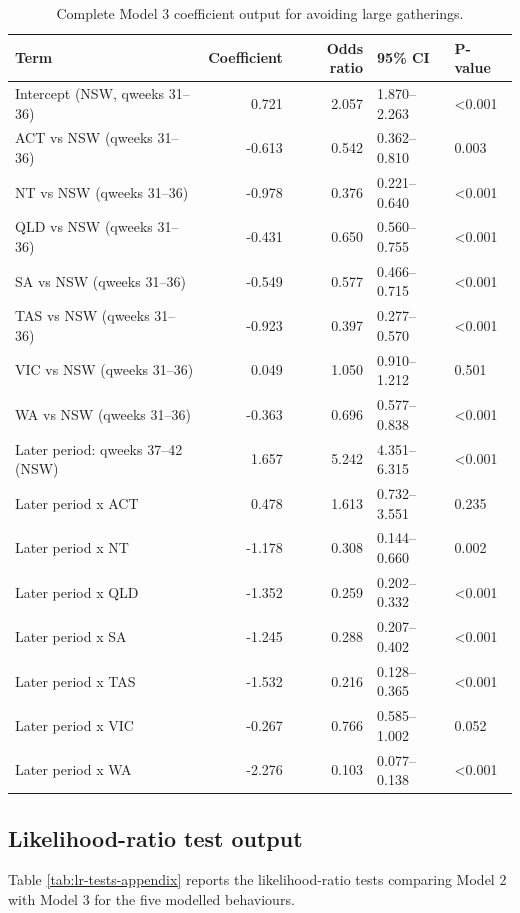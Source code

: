 \documentclass[
  12pt,
  a4paper,
]{article}
\begin{document}
\begin{longtable}[t]{lrrll}
\caption{\label{tab:model3-large-appendix}Complete Model 3 coefficient output for avoiding large gatherings.}\\
\toprule
Term & Coefficient & Odds ratio & 95\% CI & P-value\\
\midrule
Intercept (NSW, qweeks 31--36) & 0.721 & 2.057 & 1.870--2.263 & <0.001\\
ACT vs NSW (qweeks 31--36) & -0.613 & 0.542 & 0.362--0.810 & 0.003\\
NT vs NSW (qweeks 31--36) & -0.978 & 0.376 & 0.221--0.640 & <0.001\\
QLD vs NSW (qweeks 31--36) & -0.431 & 0.650 & 0.560--0.755 & <0.001\\
SA vs NSW (qweeks 31--36) & -0.549 & 0.577 & 0.466--0.715 & <0.001\\
\addlinespace
TAS vs NSW (qweeks 31--36) & -0.923 & 0.397 & 0.277--0.570 & <0.001\\
VIC vs NSW (qweeks 31--36) & 0.049 & 1.050 & 0.910--1.212 & 0.501\\
WA vs NSW (qweeks 31--36) & -0.363 & 0.696 & 0.577--0.838 & <0.001\\
Later period: qweeks 37--42 (NSW) & 1.657 & 5.242 & 4.351--6.315 & <0.001\\
Later period x ACT & 0.478 & 1.613 & 0.732--3.551 & 0.235\\
\addlinespace
Later period x NT & -1.178 & 0.308 & 0.144--0.660 & 0.002\\
Later period x QLD & -1.352 & 0.259 & 0.202--0.332 & <0.001\\
Later period x SA & -1.245 & 0.288 & 0.207--0.402 & <0.001\\
Later period x TAS & -1.532 & 0.216 & 0.128--0.365 & <0.001\\
Later period x VIC & -0.267 & 0.766 & 0.585--1.002 & 0.052\\
\addlinespace
Later period x WA & -2.276 & 0.103 & 0.077--0.138 & <0.001\\
\bottomrule
\end{longtable}

\clearpage

\subsection{Likelihood-ratio test output}\label{likelihood-ratio-test-output}

Table \ref{tab:lr-tests-appendix} reports the likelihood-ratio tests
comparing Model 2 with Model 3 for the five modelled behaviours.
\end{document}
